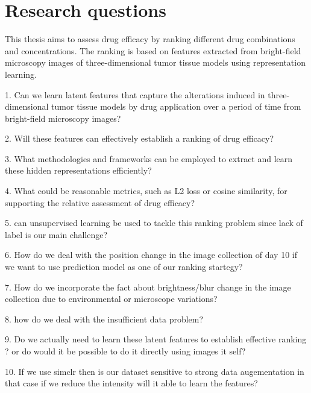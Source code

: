 \chapter{Research questions}\label{ch:Research questions}
This thesis aims to assess drug efficacy by ranking different drug combinations and concentrations. 
The ranking is based on features extracted from bright-field microscopy images of  three-dimensional tumor tissue models using
representation learning. 

1. Can we learn latent features that capture the alterations 
induced in three-dimensional tumor tissue models by drug application over a period of time from bright-field microscopy images?

2.  Will these features can effectively establish a ranking of drug efficacy?

3. What methodologies and frameworks can be employed to extract and learn these
 hidden representations efficiently?

4. What could be reasonable metrics, such as L2 loss or cosine similarity, for 
supporting the relative assessment of drug efficacy?

5. can unsupervised learning be used to tackle this ranking problem since lack of label is 
our main challenge?

6. How do we deal with the position change in the image collection of day 10 if we want to use prediction 
model as one of our ranking startegy?

7. How do we incorporate the fact about brightness/blur change in the image collection due to environmental or microscope 
variations?

8. how do we deal with the insufficient data problem?

9. Do we actually need to learn these latent features to establish effective ranking ? or do would it be possible to do it directly using images it self?

10. If we use simclr then is our dataset sensitive to strong data augementation in that case if we reduce the intensity will it able to learn the features?
